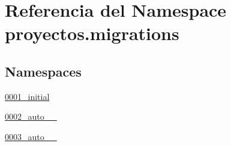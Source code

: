 \hypertarget{namespaceproyectos_1_1migrations}{}\section{Referencia del Namespace proyectos.\+migrations}
\label{namespaceproyectos_1_1migrations}
\subsection*{Namespaces}
\begin{DoxyCompactItemize}
\item 
 \hyperlink{namespaceproyectos_1_1migrations_1_10001__initial}{0001\+\_\+initial}
\item 
 \hyperlink{namespaceproyectos_1_1migrations_1_10002__auto__20160610__1357}{0002\+\_\+auto\+\_\+\_}
\item 
 \hyperlink{namespaceproyectos_1_1migrations_1_10003__auto__20160610__2156}{0003\+\_\+auto\+\_\+\_}
\end{DoxyCompactItemize}
